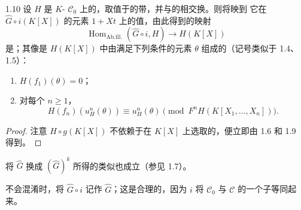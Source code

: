 \begin{SGAresult}{}{1.10}
设 $H$ 是 $K$- $\mathscr C_0$ 上的，取值于的带，并与的相交换。则将映到
它在 $\widehat G\circ i(K[X])$ 的元素 $1+Xt$ 上的值，由此得到的映射
\[
\operatorname{Hom}_{\mathrm{Ab.fil.}}(\widehat G\circ i,H)\longrightarrow H(K[X])
\]
是；其像是 $H(K[X])$ 中由满足下列条件的元素 $\theta$ 组成的（记号类似于 1.4、1.5）：
\begin{enumerate}
\item[i)] $H(f_1)(\theta)=0$；
\item[ii)] 对每个 $n\geqslant1$，
\[
H(f_n)(u_H^n(\theta))\equiv u_H^n(\theta)
\pmod{F^nH(K[X_1,\ldots,X_n])}.
\]
\end{enumerate}
\end{SGAresult}
\begin{proof}
注意 $H\circ g(K[X])$ 不依赖于在 $K[X]$ 上选取的，便立即由 1.6 和 1.9 得到。
\end{proof}

将 $\widehat G$ 换成 $(\widehat G)^k$ 所得的类似也成立（参见 1.7）。

不会混淆时，将 $\widehat G\circ i$ 记作 $\widehat G$；这是合理的，因为 $i$ 将 $\mathscr C_0$ 与 $\mathscr C$ 的一个子等同起来。


